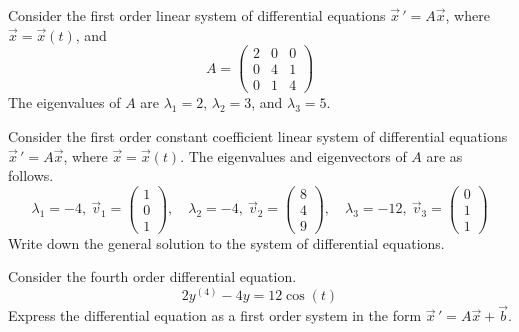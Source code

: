 \documentclass[12pt]{exam}
\begin{document}
    


\newpage

\begin{questions}

\question[6] Consider the first order linear system of differential equations $\vec x \, ' = A\vec x$, where $\vec x = \vec x(t)$, and $$A = \begin{pmatrix} 2&0&0\\0&4&1\\0&1&4\end{pmatrix}$$
The eigenvalues of $A$ are $\lambda_1 = 2$, $\lambda_2 = 3$, and $\lambda_3 = 5$. 

\newpage 

\question[4] Consider the first order constant coefficient linear system of differential equations $\vec x \, ' = A\vec x$, where $\vec x = \vec x(t)$. The eigenvalues and eigenvectors of $A$ are as follows. $$\lambda_1 = -4, \ \vec v_1 = \begin{pmatrix}1\\0\\1 \end{pmatrix} , \quad \lambda_2 = -4, \ \vec v_2 = \begin{pmatrix} 8\\4\\9 \end{pmatrix}, \quad \lambda_3 = -12, \ \vec v_3 = \begin{pmatrix} 0\\1\\1\end{pmatrix}$$
Write down the general solution to the system of differential equations.



\newpage

\question[4] Consider the fourth order differential equation. 
$$2y^{(4)}-4y=12\cos(t)$$
Express the differential equation as a first order system in the form $\vec x \, ' = A \vec x + \vec b$. 


\end{questions}
\end{document}
